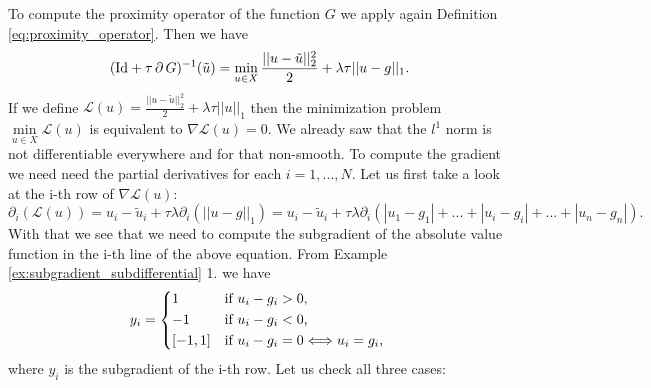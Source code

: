         To compute the proximity operator of the function $G$ we apply again Definition \ref{eq:proximity_operator}. Then we have
            $$
                (\textnormal{Id} + \tau\,\partial\,G)^{-1}(\tilde{u}) = \min_{u \in X} \frac{||u - \tilde{u}||_{2}^{2}}{2} + \lambda\tau||u - g||_{1}.
            $$
        If we define $\mathcal{L}(u) = \frac{||u - \tilde{u}||_{2}^{2}}{2} + \lambda\tau||u||_{1}$ then the minimization problem $\min\limits_{u \in X} \mathcal{L}(u)$ is equivalent to $\nabla\mathcal{L}(u) = 0$. We already saw that the $l^{1}$ norm is not differentiable everywhere and for that non-smooth. To compute the gradient we need need the partial derivatives for each $i = 1, ..., N$. Let us first take a look at the i-th row of $\nabla\mathcal{L}(u)$:
            $$
                \partial_{i}(\mathcal{L}(u)) = u_{i} - \tilde{u}_{i} + \tau\lambda \partial_{i}(||u-g||_{1}) = u_{i} - \tilde{u}_{i} + \tau\lambda \partial_{i}(|u_{1}-g_{1}| + ... + |u_{i}-g_{i}| + ... + |u_{n}-g_{n}|).
            $$
        With that we see that we need to compute the subgradient of the absolute value function in the i-th line of the above equation. From Example \ref{ex:subgradient_subdifferential} 1. we have
            $$
                y_{i} =
                    \begin{dcases*}
                        1 & \textnormal{if $u_{i} - g_{i} > 0$,} \\
                        -1 & \textnormal{if $u_{i} - g_{i} < 0$,} \\
                        [-1, 1] & \textnormal{if $u_{i} - g_{i} = 0 \Longleftrightarrow u_{i} = g_{i}$,}
                    \end{dcases*}
            $$
        where $y_{i}$ is the subgradient of the i-th row. Let us check all three cases:

